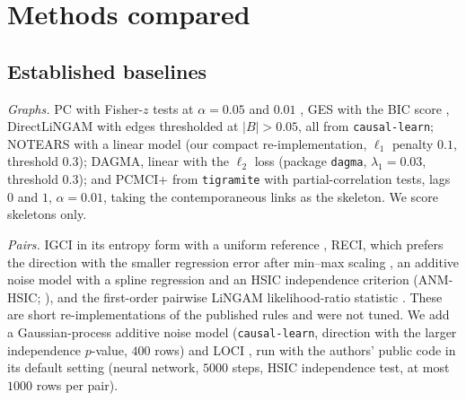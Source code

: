 
\section{Methods compared}\label{sec:methods}

\subsection{Established baselines}

\emph{Graphs.} PC with Fisher-$z$ tests at $\alpha=0.05$ and $0.01$ \citep{spirtes2000causation},
GES with the BIC score \citep{chickering2002optimal}, DirectLiNGAM
\citep{shimizu2011directlingam} with edges thresholded at $|B|>0.05$, all from
\texttt{causal-learn}; NOTEARS with a linear model \citep{zheng2018dags} (our compact
re-implementation, $\ell_1$ penalty $0.1$, threshold $0.3$); DAGMA, linear with the $\ell_2$ loss
(package \texttt{dagma}, $\lambda_1=0.03$, threshold $0.3$); and PCMCI+ \citep{runge2020discovering} from
\texttt{tigramite} with partial-correlation tests, lags $0$ and $1$, $\alpha=0.01$, taking the
contemporaneous links as the skeleton. We score skeletons only.

\emph{Pairs.} IGCI in its entropy form with a uniform reference \citep{daniusis2010inferring},
RECI, which prefers the direction with the smaller regression error after min--max scaling
\citep{blobaum2018cause}, an additive noise model with a spline regression and an HSIC
independence criterion (ANM-HSIC; \citealt{hoyer2009nonlinear}), and the first-order pairwise
LiNGAM likelihood-ratio statistic \citep{hyvarinen2013pairwise}. These are short
re-implementations of the published rules and were not tuned. We add a Gaussian-process additive
noise model (\texttt{causal-learn}, direction with the larger independence $p$-value, $400$ rows)
and LOCI \citep{immer2023loci}, run with the authors' public code in its default setting (neural
network, $5000$ steps, HSIC independence test, at most $1000$ rows per pair).

